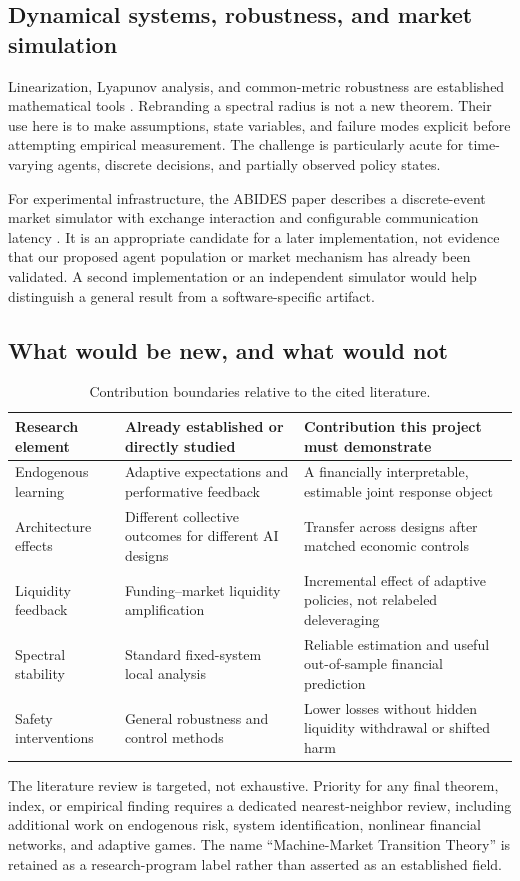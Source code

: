 \documentclass[11pt,a4paper]{article}
\theoremstyle{definition}
\theoremstyle{remark}
\begin{document}
\subsection{Dynamical systems, robustness, and market simulation}
Linearization, Lyapunov analysis, and common-metric robustness are established mathematical tools \citep{khalil2002,boyd1994}. Rebranding a spectral radius is not a new theorem. Their use here is to make assumptions, state variables, and failure modes explicit before attempting empirical measurement. The challenge is particularly acute for time-varying agents, discrete decisions, and partially observed policy states.

For experimental infrastructure, the ABIDES paper describes a discrete-event market simulator with exchange interaction and configurable communication latency \citep{byrd2019}. It is an appropriate candidate for a later implementation, not evidence that our proposed agent population or market mechanism has already been validated. A second implementation or an independent simulator would help distinguish a general result from a software-specific artifact.

\subsection{What would be new, and what would not}
\begin{table}[htbp]
\centering\small
\caption{Contribution boundaries relative to the cited literature.}
\label{tab:novelty}
\begin{tabularx}{\textwidth}{p{}YY}
\toprule
Research element & Already established or directly studied & Contribution this project must demonstrate \\
\midrule
Endogenous learning & Adaptive expectations and performative feedback & A financially interpretable, estimable joint response object \\
Architecture effects & Different collective outcomes for different AI designs & Transfer across designs after matched economic controls \\
Liquidity feedback & Funding--market liquidity amplification & Incremental effect of adaptive policies, not relabeled deleveraging \\
Spectral stability & Standard fixed-system local analysis & Reliable estimation and useful out-of-sample financial prediction \\
Safety interventions & General robustness and control methods & Lower losses without hidden liquidity withdrawal or shifted harm \\
\bottomrule
\end{tabularx}
\end{table}
The literature review is targeted, not exhaustive. Priority for any final theorem, index, or empirical finding requires a dedicated nearest-neighbor review, including additional work on endogenous risk, system identification, nonlinear financial networks, and adaptive games. The name ``Machine-Market Transition Theory'' is retained as a research-program label rather than asserted as an established field.
\end{document}
